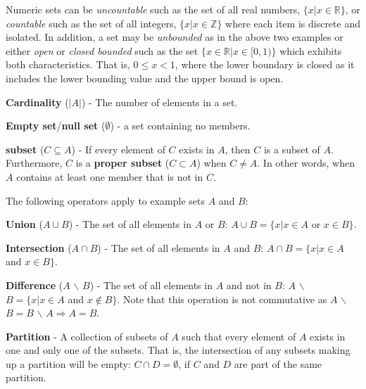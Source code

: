 Numeric sets can be \emph{uncountable} such as the set of all real numbers, $\{x| x \in \mathbb{R}\}$, or \emph{countable} such as the set of all integers, $\{x| x \in \mathbb{Z}\}$ where each item is discrete and isolated.
%
In addition, a set may be \emph{unbounded} as in the above two examples or either \emph{open} or \emph{closed bounded} such as the set $\{x \in \mathbb{R} | x \in [0,1)\}$ which exhibits both characteristics.
%
That is, $0 \le x < 1$, where the lower boundary is closed as it includes the lower bounding value and the upper bound is open.

\begin{defn}
  \textbf{Cardinality} ($|A|$) - The number of elements in a set.
\end{defn}

\begin{defn}
  \textbf{Empty set}/\textbf{null set} ($\emptyset$) - a set containing no members.
\end{defn}

\begin{defn}
  \textbf{subset} ($C \subseteq A$) - If every element of $C$ exists in $A$, then $C$ is a subset of $A$.
  Furthermore, $C$ is a \textbf{proper subset} ($C \subset A$) when $C \neq A$.
  In other words, when $A$ contains at least one member that is not in $C$.
\end{defn}

The following operators apply to example sets $A$ and $B$:

\begin{defn}
  \textbf{Union} ($A \cup B$) - The set of all elements in $A$ or $B$: $A \cup B = \{x| x \in A$ or $x \in B\}$.
\end{defn}

\begin{defn}
  \textbf{Intersection} ($A \cap B$) - The set of all elements in $A$ and $B$: $A \cap B = \{x| x \in A$ and $x \in B\}$.
\end{defn}

\begin{defn}
  \textbf{Difference} ($A$ $\backslash$ $B$) - The set of all elements in $A$ and not in $B$: $A$ $\backslash$ $B = \{x| x \in A$ and $x \notin B\}$.
  Note that this operation is not commutative as $A$ $\backslash$ $B = B$ $\backslash$ $A \Rightarrow A = B$.
\end{defn}

\begin{defn}
  \textbf{Partition} - A collection of subsets of $A$ such that every element of $A$ exists in one and only one of the subsets.
  That is, the intersection of any subsets making up a partition will be empty: $C \cap D = \emptyset$, if $C$ and $D$ are part of the same partition.
\end{defn}

